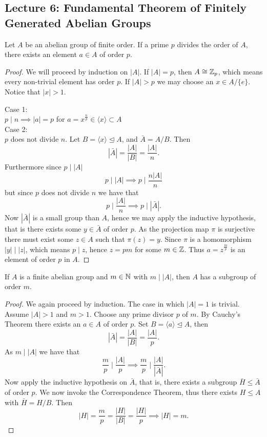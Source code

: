 \documentclass[11pt,leqno,oneside]{amsart}
\newcommand{\normsubgroup}{\mathrel{\unlhd}}
\newcommand{\isom}{\mathrel{\cong}}
\begin{document}
\subsection*{Lecture 6: Fundamental
  Theorem of Finitely Generated Abelian
  Groups}

\begin{thm*}
  Let \(A\) be an abelian group of
  finite order. If a prime \(p\) divides
  the order of \(A\), there exists an
  element \(a \in A\) of order \(p\).
\end{thm*}

\begin{proof}
  We will proceed by induction on
  \(|A|\). If \(|A|=p\), then
  \(A \isom \Z_p\), which means every
  non-trivial element has order
  \(p\). If \(|A| > p\) we may choose an
  \(x \in A/\{e\}\). Notice that
  \(|x| > 1\).

  \noindent Case 1:\\
  \(p \mid n \implies |a|=p\) for
  \(a=x^{\frac{n}{p}} \in \langle x
  \rangle \subset A\)\\

  \noindent Case 2:\\ \(p\) does not
  divide \(n\). Let
  \(B=\langle x \rangle \normsubgroup
  A\), and \(\bar{A}=A /B\). Then
  \[|\bar{A}|=\frac{|A|}{|B|}=\frac{|A|}{n}.\]
  Furthermore since \(p \mid |A|\)
  \[p \mid |A| \implies p \mid
    \frac{n|A|}{n}\] but since \(p\)
  does not divide \(n\) we have that
  \[p \mid \frac{|A|}{n}\implies p \mid
    |\bar{A}|.\] Now \(|\bar{A}|\) is a
  small group than \(A\), hence we may
  apply the inductive hypothesis, that
  is there exists some \(y \in \bar{A}\)
  of order \(p\). As the projection map
  \(\pi\) is surjective there must exist
  some \(z \in A\) such that
  \(\pi(z)=y\). Since \(\pi\) is a
  homomorphism \(|y| \mid |z|\), which
  means \(p \mid z\), hence \(z=pm\) for
  some \(m \in {\mathbb Z}\). Thus
  \(a=z^{\frac{m}{p}}\) is an element of
  order \(p\) in \(A\).
\end{proof}

\begin{prop*}[1.2.7]
  If \(A\) is a finite abelian group and
  \(m \in {\mathbb N}\) with \(m \mid |A|\), then
  \(A\) has a subgroup of order \(m\).
\end{prop*}
\begin{proof}
  We again proceed by induction. The
  case in which \(|A|=1\) is
  trivial. Assume \(|A|>1\) and
  \(m>1\). Choose any prime divisor
  \(p\) of \(m\). By Cauchy's Theorem
  there exists an \(a \in A\) of order
  \(p\). Set
  \(B=\langle a\rangle \unlhd A\), then
  \[|\bar{A}|=\frac{|A|}{|B|}=\frac{|A|}{p}.\]
  As \(m \mid |A|\) we have that
  \[\frac{m}{p} \mid \frac{|A|}{p}
    \implies \frac{m}{p} \mid
    \frac{|A|}{|\bar{A}|}.\] Now apply
  the inductive hypothesis on
  \(\bar{A}\), that is, there exists a
  subgroup \(\bar{H} \le \bar{A}\) of
  order \(p\). We now invoke the
  Correspondence Theorem, thus there
  exists \(H \le A\) with
  \(\bar{H}=H/B\). Then
  \[|H|=\frac{m}{p}=\frac{|H|}{|B|}=\frac{|H|}{p}
    \implies |H|=m.\]
\end{proof}
\end{document}
